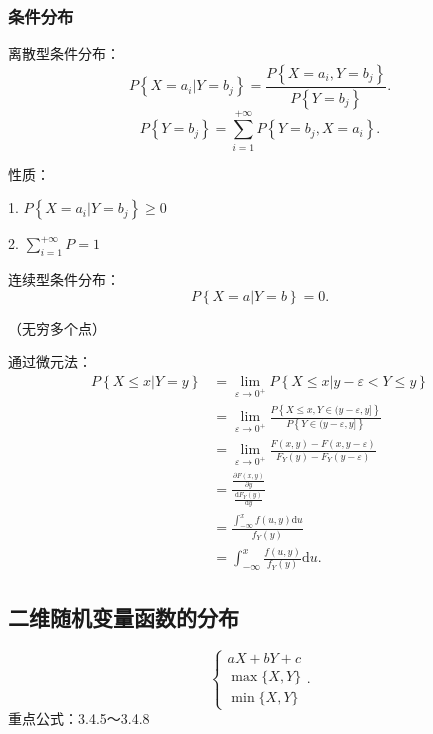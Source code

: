 \subsubsection{条件分布}%
\label{subsub:条件分布}
\begin{notation}
    离散型条件分布：
    \[
        P\left\{ X=a_i|Y=b_j \right\} =\frac{P\left\{ X=a_i,Y=b_j \right\} }{P\left\{ Y=b_j \right\} }
    .\] 
    \[
        P\left\{ Y=b_j \right\} =\sum_{i=1}^{+\infty} P\left\{ Y=b_j,X=a_i \right\} 
    .\] 

    性质：

    1. $P\left\{ X=a_i|Y=b_j \right\} \ge 0$

    2. $\displaystyle{\sum_{i=1}^{+\infty} P=1}$
\end{notation}
\begin{notation}
    连续型条件分布：
    \[
        P\left\{ X=a|Y=b \right\} =0
    .\] 

    （无穷多个点）

    通过微元法：
    \begin{align*}
        P\left\{ X\le x|Y=y \right\} &=\lim_{\varepsilon \to 0^{+}} P\left\{ X\le x|y-\varepsilon < Y \le y \right\} \\
                                     &= \lim_{\varepsilon \to 0^+} \frac{P\left\{ X\le x,Y\in (y-\varepsilon,y] \right\} }{P\left\{ Y\in (y-\varepsilon,y] \right\} } \\
                                     &= \lim_{\varepsilon \to 0^+} \frac{F\left( x,y \right) -F\left( x,y-\varepsilon \right) }{F_{Y}\left( y \right) -F_{Y}\left( y-\varepsilon \right) } \\
                                     &= \frac{\displaystyle{\frac{\partial F\left( x,y \right) }{\partial y} }}{\displaystyle{\frac{\mathrm{d}F_Y\left( y \right) }{\mathrm{d}y}}} \\
                                     &= \frac{\displaystyle{\int_{-\infty}^{x} f\left( u,y \right) \mathrm{d}u}}{f_{Y}\left( y \right) } \\
                                     &= \int_{-\infty}^{x} \frac{f\left( u,y \right) }{f_{Y}\left( y \right) } \mathrm{d}u
    .\end{align*}
\end{notation}
\subsection{二维随机变量函数的分布}%
\label{sub:二维随机变量函数的分布}
\[
    \begin{cases}
        aX+bY+c\\
        \max\{X,Y\}\\
        \min\{X,Y\}
    \end{cases}
.\] 
重点公式：3.4.5～3.4.8

